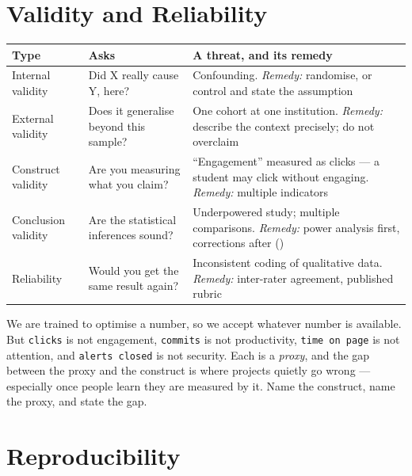\section{Validity and Reliability}

\begin{longtable}{@{}L{3.0cm}L{4.6cm}L{6.4cm}@{}}
\toprule
{}
\textbf{Type} & \textbf{Asks} & \textbf{A threat, and its remedy} \\
\midrule
\endhead
Internal validity & Did X really cause Y, here? & Confounding. \emph{Remedy:} randomise, or control and state the assumption \\
External validity & Does it generalise beyond this sample? & One cohort at one institution. \emph{Remedy:} describe the context precisely; do not overclaim \\
Construct validity & Are you measuring what you claim? & ``Engagement'' measured as clicks --- a student may click without engaging. \emph{Remedy:} multiple indicators \\
Conclusion validity & Are the statistical inferences sound? & Underpowered study; multiple comparisons. \emph{Remedy:} power analysis first, corrections after () \\
Reliability & Would you get the same result again? & Inconsistent coding of qualitative data. \emph{Remedy:} inter-rater agreement, published rubric \\
\bottomrule
\end{longtable}

\begin{conceptbox}
We are trained to optimise a number, so we accept whatever number is available. But
\texttt{clicks} is not engagement, \texttt{commits} is not productivity,
\texttt{time on page} is not attention, and \texttt{alerts closed} is not security.
Each is a \emph{proxy}, and the gap between the proxy and the construct is where
projects quietly go wrong --- especially once people learn they are measured by it.
Name the construct, name the proxy, and state the gap.
\end{conceptbox}

\section{Reproducibility}

